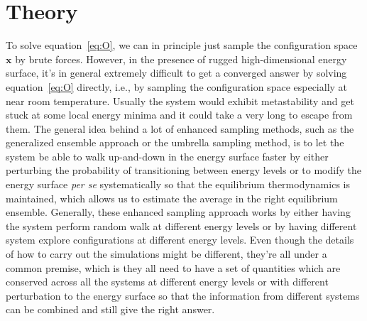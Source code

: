 \section{Theory} 
To solve equation~\ref{eq:O}, we can in principle just sample the 
configuration space $\mathbf{x}$ by brute forces. However, in the 
presence of rugged high-dimensional energy surface, it's in general
extremely difficult to get a converged answer by solving equation~\ref{eq:O} directly, 
i.e., by sampling the configuration space especially at near room temperature.
Usually the system would exhibit metastability and get stuck at some local
energy minima and it could take a very long to escape from them. The general
idea behind a lot of enhanced sampling methods, such as the generalized 
ensemble approach or the umbrella sampling method, is to let the system 
be able to walk up-and-down in the energy surface faster by either
perturbing the probability of transitioning between energy levels or to 
modify the energy surface \textit{per se} systematically so that the 
equilibrium thermodynamics is maintained, which allows us to estimate
the average in the right equilibrium ensemble. Generally, these enhanced 
sampling approach works by either having the system perform random walk 
at different energy levels or by having different system explore configurations
at different energy levels. Even though the details of how to carry out 
the simulations might be different, they're all under a common premise, 
which is they all need to have a set of quantities which are conserved 
across all the systems at different energy levels or with different 
perturbation to the energy surface so that the information from different 
systems can be combined and still give the right answer.

